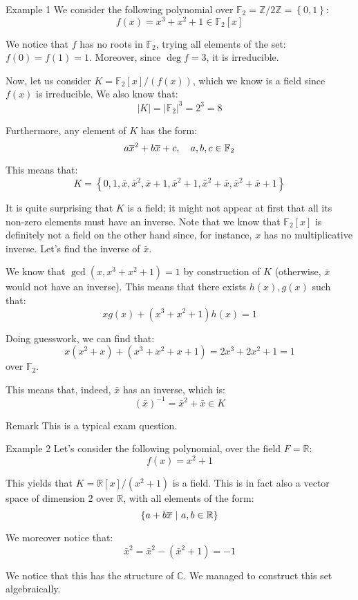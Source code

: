 \documentclass[a4paper]{article}
\begin{document}
\begin{parag}{Example 1}
    We consider the following polynomial over $\mathbb{F}_2 = \mathbb{Z}/2\mathbb{Z} = \left\{0, 1\right\}$: 
    \[f\left(x\right) = x^3 + x^2 + 1 \in \mathbb{F}_2\left[x\right]\]
    
    We notice that $f$ has no roots in $\mathbb{F}_2$, trying all elements of the set: $f\left(0\right) = f\left(1\right) = 1$. Moreover, since $\deg f = 3$, it is irreducible.

    Now, let us consider $K = \mathbb{F}_2\left[x\right] / \left(f\left(x\right)\right)$, which we know is a field since $f\left(x\right)$ is irreducible. We also know that: 
    \[\left|K\right| = \left|\mathbb{F}_2\right|^3 = 2^3 = 8\]
    
    Furthermore, any element of $K$ has the form: 
    \[a\overline{x}^2 + b \overline{x} + c, \quad a, b, c \in \mathbb{F}_2\]
    
    This means that: 
    \[K = \left\{0, 1, \bar{x}, \bar{x}^2, \bar{x} + 1, \bar{x}^2 + 1, \bar{x}^2 + \bar{x}, \bar{x}^2 + \bar{x} + 1\right\}\]
    
    It is quite surprising that $K$ is a field; it might not appear at first that all its non-zero elements must have an inverse. Note that we know that $\mathbb{F}_2\left[x\right]$ is definitely not a field on the other hand since, for instance, $x$ has no multiplicative inverse. Let's find the inverse of $\bar{x}$. 

    We know that $\gcd\left(x, x^3 + x^2 + 1\right) = 1$ by construction of $K$ (otherwise, $\bar{x}$ would not have an inverse). This means that there exists $h\left(x\right),  g\left(x\right)$ such that: 
    \[x g\left(x\right) + \left(x^3 + x^2 + 1\right)h\left(x\right) = 1\]
    
    Doing guesswork, we can find that: 
    \[x \left(x^2 + x\right) + \left(x^3 + x^2 + x + 1\right) = 2x^3 + 2x^2 + 1 = 1\]
    over $\mathbb{F}_2$.

    This means that, indeed, $\bar{x}$ has an inverse, which is: 
    \[\left(\bar{x}\right)^{-1} = \bar{x}^2 + \bar{x} \in K\]
    
    \begin{subparag}{Remark}
        This is a typical exam question.
    \end{subparag}
\end{parag}

\begin{parag}{Example 2}
    Let's consider the following polynomial, over the field $F = \mathbb{R}$: 
    \[f\left(x\right) = x^2 + 1\]
    
    This yields that $K = \mathbb{R}\left[x\right] / \left(x^2 + 1\right)$ is a field. This is in fact also a vector space of dimension 2 over $\mathbb{R}$, with all elements of the form: 
    \[\left\{a + b \bar{x} \suchthat a, b \in \mathbb{R}\right\}\]
    
    We moreover notice that: 
    \[\bar{x}^2 = \bar{x}^2 - \left(\bar{x}^2 + 1\right) = -1\]
    
    We notice that this has the structure of $\mathbb{C}$. We managed to construct this set algebraically.
\end{parag}
\end{document}
